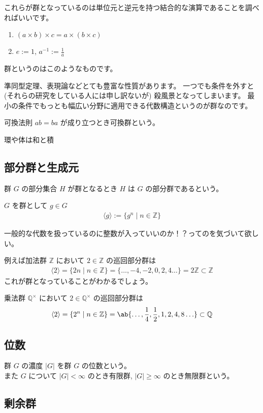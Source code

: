 \documentclass[uplatex,dvipdfmx,a4paper,11pt]{jlreq}
\newcommand{\QQ}{\mathbb{Q}}
\newcommand{\ZZ}{\mathbb{Z}}
\theoremstyle{definition}
\begin{document}
これらが群となっているのは単位元と逆元を持つ結合的な演算であることを調べればいいです。
\begin{enumerate}
  \item $(a \times b) \times c = a \times (b \times c)$
  \item $e := 1$, $a^{-1} := \frac{1}{a}$
\end{enumerate}

群というのはこのようなものです。

準同型定理、表現論などとても豊富な性質があります。
一つでも条件を外すと (それらの研究をしている人には申し訳ないが) 殺風景となってしまいます。
最小の条件でもっとも幅広い分野に適用できる代数構造というのが群なのです。

可換法則 $ab = ba$ が成り立つとき可換群という。

環や体は和と積

\subsection{部分群と生成元}

\begin{definition}[部分群]
  群 $G$ の部分集合 $H$ が群となるとき $H$ は $G$ の部分群であるという。
\end{definition}

\begin{definition}
  $G$ を群として $g\in G$
  \begin{align}
    \langle g\rangle := \{g^n\mid n\in\ZZ\}
  \end{align}
\end{definition}
一般的な代数を扱っているのに整数が入っていいのか！？ってのを気づいて欲しい。

例えば加法群 $\ZZ$ において $2\in\ZZ$ の巡回部分群は
\begin{align}
  \langle 2\rangle = \{2n\mid n\in\ZZ\} = \{\ldots,-4, -2, 0, 2, 4\ldots\} = 2\ZZ \subset\ZZ
\end{align}
これが群となっていることがわかるでしょう。

乗法群 $\QQ^\times$ において $2\in\QQ^\times$ の巡回部分群は
\begin{align}
  \langle 2\rangle = \{2^n\mid n\in\ZZ\} = \ab\{\ldots, \frac{1}{4}, \frac{1}{2}, 1, 2, 4, 8\ldots\}\subset\QQ
\end{align}

\subsection{位数}
\begin{definition}[群の位数]
  群 $G$ の濃度 $|G|$ を群 $G$ の位数という。 \\
  また $G$ について $|G| < \infty$ のとき有限群, $|G| \geq \infty$ のとき無限群という。
\end{definition}


\subsection{剰余群}
\end{document}

